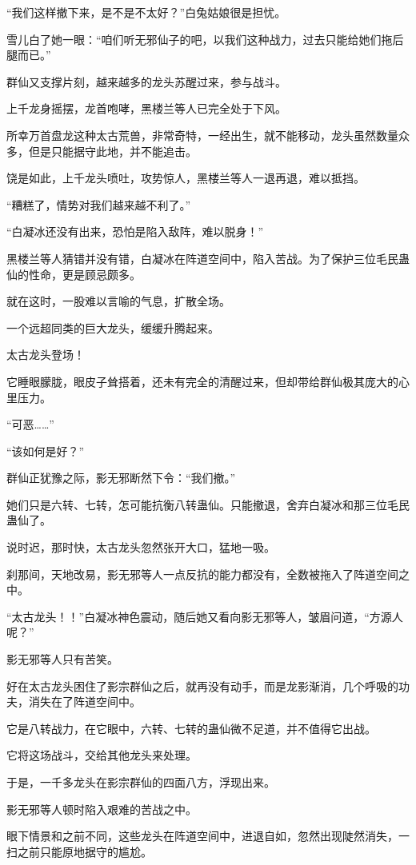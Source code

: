 \begin{this_body}
“我们这样撤下来，是不是不太好？”白兔姑娘很是担忧。

雪儿白了她一眼：“咱们听无邪仙子的吧，以我们这种战力，过去只能给她们拖后腿而已。”

群仙又支撑片刻，越来越多的龙头苏醒过来，参与战斗。

上千龙身摇摆，龙首咆哮，黑楼兰等人已完全处于下风。

所幸万首盘龙这种太古荒兽，非常奇特，一经出生，就不能移动，龙头虽然数量众多，但是只能据守此地，并不能追击。

饶是如此，上千龙头喷吐，攻势惊人，黑楼兰等人一退再退，难以抵挡。

“糟糕了，情势对我们越来越不利了。”

“白凝冰还没有出来，恐怕是陷入敌阵，难以脱身！”

黑楼兰等人猜错并没有错，白凝冰在阵道空间中，陷入苦战。为了保护三位毛民蛊仙的性命，更是顾忌颇多。

就在这时，一股难以言喻的气息，扩散全场。

一个远超同类的巨大龙头，缓缓升腾起来。

太古龙头登场！

它睡眼朦胧，眼皮子耸搭着，还未有完全的清醒过来，但却带给群仙极其庞大的心里压力。

“可恶……”

“该如何是好？”

群仙正犹豫之际，影无邪断然下令：“我们撤。”

她们只是六转、七转，怎可能抗衡八转蛊仙。只能撤退，舍弃白凝冰和那三位毛民蛊仙了。

说时迟，那时快，太古龙头忽然张开大口，猛地一吸。

刹那间，天地改易，影无邪等人一点反抗的能力都没有，全数被拖入了阵道空间之中。

“太古龙头！！”白凝冰神色震动，随后她又看向影无邪等人，皱眉问道，“方源人呢？”

影无邪等人只有苦笑。

好在太古龙头困住了影宗群仙之后，就再没有动手，而是龙影渐消，几个呼吸的功夫，消失在了阵道空间中。

它是八转战力，在它眼中，六转、七转的蛊仙微不足道，并不值得它出战。

它将这场战斗，交给其他龙头来处理。

于是，一千多龙头在影宗群仙的四面八方，浮现出来。

影无邪等人顿时陷入艰难的苦战之中。

眼下情景和之前不同，这些龙头在阵道空间中，进退自如，忽然出现陡然消失，一扫之前只能原地据守的尴尬。


\end{this_body}
